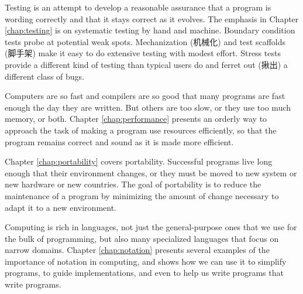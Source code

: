 Testing is an attempt to develop a reasonable assurance that a program is
wording correctly and that it stays correct as it evolves. The emphasis in
Chapter \ref{chap:testing} is on systematic testing by hand and machine.
Boundary condition tests probe at potential weak spots.
Mechanization (机械化) and test scaffolds (脚手架) make it easy to do
extensive testing with modest effort.  Stress tests provide a different
kind of testing than typical users do and ferret out (揪出) a different
class of bugs.

Computers are so fast and compilers are so good that many programs are fast
enough the day they are written. But others are too slow, or they use too
much memory, or both. Chapter \ref{chap:performance} presents an orderly
way to approach the task of making a program use resources efficiently, so
that the program remains correct and sound as it is made more efficient.

Chapter \ref{chap:portability} covers portability. Successful programs live
long enough that their environment changes, or they must be moved to new
system or new hardware or new countries. The goal of portability is to
reduce the maintenance of a program by minimizing the amount of change
necessary to adapt it to a new environment.

Computing is rich in languages, not just the general-purpose ones that we
use for the bulk of programming, but also many specialized languages that
focus on narrow domains. Chapter \ref{chap:notation} presents several
examples of the importance of notation in computing, and shows how we can
use it to simplify programs, to guide implementations, and even to help us
write programs that write programs.


